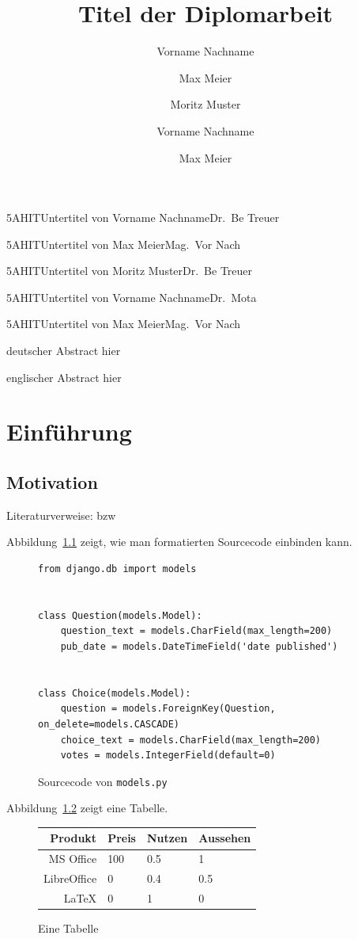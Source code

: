 \documentclass[medt,2017]{hitda}
\title{Titel der Diplomarbeit}
\begin{document}
\begin{titlepage}
\author{Vorname Nachname}{5AHIT}{Untertitel von Vorname Nachname}{Dr.\ Be Treuer}
\author{Max Meier}{5AHIT}{Untertitel von Max Meier}{Mag.\ Vor Nach}
\author{Moritz Muster}{5AHIT}{Untertitel von Moritz Muster}{Dr.\ Be Treuer}
\author{Vorname Nachname}{5AHIT}{Untertitel von Vorname Nachname}{Dr.\ Mota}
\author{Max Meier}{5AHIT}{Untertitel von Max Meier}{Mag.\ Vor Nach}
\end{titlepage}

\declaration

\begin{abstract-de}
deutscher Abstract hier
\end{abstract-de}

\begin{abstract-en}
englischer Abstract hier
\end{abstract-en}

\tableofcontents

\chapter{Einführung}
\begincontent
{}
\section{Motivation}
Literaturverweise: \cite{book} bzw \cite{article, incollection, inbook}

Abbildung~\ref{fig:sourcecode} zeigt, wie man formatierten Sourcecode einbinden kann.
\begin{figure}[h]
\begin{lstlisting}
from django.db import models


class Question(models.Model):
    question_text = models.CharField(max_length=200)
    pub_date = models.DateTimeField('date published')


class Choice(models.Model):
    question = models.ForeignKey(Question, on_delete=models.CASCADE)
    choice_text = models.CharField(max_length=200)
    votes = models.IntegerField(default=0)
\end{lstlisting}
\caption{Sourcecode von \texttt{models.py}}
\label{fig:sourcecode}
\end{figure}

Abbildung~\ref{fig:table} zeigt eine Tabelle.

\begin{figure}\centering
\begin{tabular}{r|lll}
\toprule
Produkt & Preis & Nutzen & Aussehen\\
\midrule
MS Office & 100 & 0.5 & 1\\
LibreOffice & 0 & 0.4 & 0.5 \\
\LaTeX & 0 & 1 & 0 \\
\bottomrule
\end{tabular}
\caption{Eine Tabelle}
\label{fig:table}
\end{figure}
\end{document}

